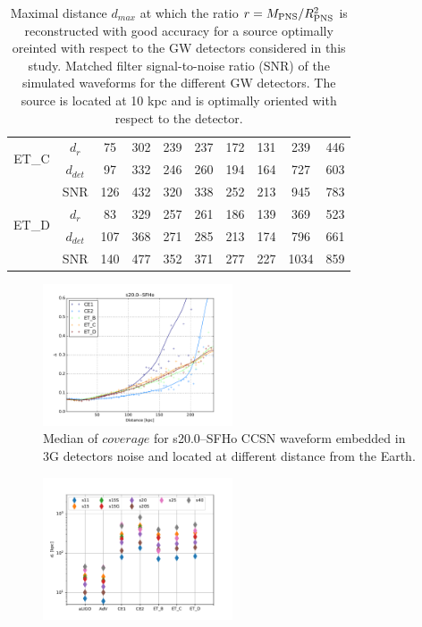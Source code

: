 \begin{table}
\begin{tabular}{c|c|cccccccc}
\hline
\multirow{2}{*}{ET\_C} & $d_{r}$ & 75  & 302 & 239 & 237 & 172 & 131 & 239 & 446 \\
\cline{2-10}
                       & $d_{det}$ & 97 & 332 & 246 & 260 & 194 & 164 & 727  & 603\\
                       & SNR      & 126 & 432 & 320 & 338 & 252 & 213 & 945 & 783\\

\hline
\multirow{2}{*}{ET\_D} & $d_{r}$ & 83  & 329 & 257 & 261 & 186 & 139 & 369 & 523 \\
\cline{2-10}
                       & $d_{det}$ & 107 & 368 & 271 & 285 & 213 & 174 & 796  & 661\\
                       & SNR      & 140 & 477 & 352 & 371 & 277 & 227 & 1034 & 859 \\

  \end{tabular}
  \caption{%
    Maximal distance $d_{max}$ at which the ratio $r=M_{\rm PNS}/R_{\rm PNS}^2$ is reconstructed
    with good accuracy for a source optimally oreinted with respect to the GW detectors
    considered in this study.
    Matched filter signal-to-noise ratio (SNR) of the simulated waveforms for
    the different GW detectors. The source is located at 10 kpc and is optimally oriented
    with respect to the detector.
  }
  \label{tab:results}
\end{table}

\begin{figure}
  \centering
  \includegraphics[width=0.5\textwidth]{plots/s20--SFHo_all3G}
  \caption{Median of $coverage$ for s20.0--SFHo CCSN waveform embedded in 3G detectors noise and located at different distance from the Earth. } \label{fig:s20--SFHo_all3G}
\end{figure}

\begin{figure}
  \centering
  \includegraphics[width=0.5\textwidth]{plots/dist_allwvfs_2G3G}
  \caption{} \label{fig:distances}
\end{figure}
